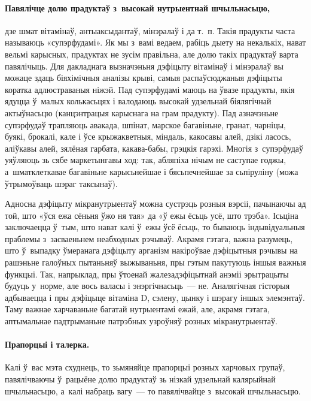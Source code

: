 \paragraph{Павялічце долю прадуктаў з~высокай нутрыентнай шчыльнасьцю,} дзе шмат вітамінаў, антыаксыдантаў, мінэралаў і да т.~п. Такія прадукты часта называюць «супэрфудамі». Як мы з~вамі ведаем, рабіць дыету на некалькіх, нават вельмі карысных, прадуктах не зусім правільна, але долю такіх прадуктаў варта павялічыць. Для дакладнага вызначэньня дэфіцыту вітамінаў і мінэралаў вы можаце здаць біяхімічныя аналізы крыві, самыя распаўсюджаныя дэфіцыты коратка адлюстраваныя ніжэй. Пад супэрфудамі маюць на ўвазе прадукты, якія ядуцца ў~малых колькасьцях і валодаюць высокай удзельнай біялягічнай актыўнасьцю (канцэнтрацыя карыснага на грам прадукту). Пад азначэньне супэрфудаў трапляюць авакада, шпінат, марское багавіньне, гранат, чарніцы, буякі, брокалі, кале і ўсе крыжакветныя, міндаль, какосавы алей, дзікі ласось, аліўкавы алей, зялёная гарбата, какава-бабы, грэцкія гарэхі. Многія з~супэрфудаў уяўляюць зь сябе маркетынгавы ход: так, абляпіха нічым не саступае годжы, а~шматклеткавае багавіньне карысьнейшае і бясьпечнейшае за сьпіруліну (можа ўтрымоўваць шэраг таксынаў).

Адносна дэфіцыту мікранутрыентаў можна сустрэць розныя вэрсіі, пачынаючы ад той, што «ўся ежа сёньня ўжо ня тая» да «ў ежы ёсьць усё, што трэба». Ісьціна заключаецца ў~тым, што нават калі ў~ежы ўсё ёсьць, то бываюць індывідуальныя праблемы з~засваеньнем неабходных рэчываў. Акрамя гэтага, важна разумець, што ў~выпадку ўмеранага дэфіцыту арганізм накіроўвае дэфіцытныя рэчывы на рашэньне галоўных пытаньняў выжываньня, пры гэтым пакутуюць іншыя важныя функцыі. Так, напрыклад, пры ўтоенай жалезадэфіцытнай анэміі эрытрацыты будуць у~норме, але вось валасы і энэргічнасьць~--- не. Аналягічная гісторыя адбываецца і пры дэфіцыце вітаміна D, сэлену, цынку і шэрагу іншых элемэнтаў. Таму важнае харчаваньне багатай нутрыентамі ежай, але, акрамя гэтага, аптымальнае падтрыманьне патрэбных узроўняў розных мікранутрыентаў.

\paragraph{Прапорцыі і талерка.}
Калі ў~вас мэта схуднець, то зьмяняйце прапорцыі розных харчовых групаў, павялічваючы ў~рацыёне долю прадуктаў зь нізкай удзельнай калярыйнай шчыльнасьцю, а~калі набраць вагу~--- то павялічвайце з~высокай шчыльнасьцю.

